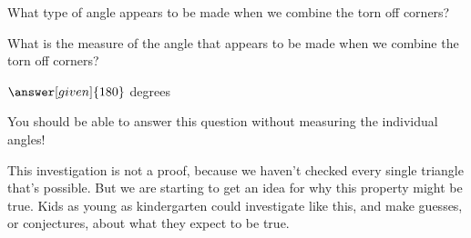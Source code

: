 \documentclass{ximera}
\begin{document}
\begin{question}
What type of angle appears to be made when we combine the torn off corners?
\begin{multipleChoice}
\end{multipleChoice}
\end{question}

\begin{question} 
  What is the measure of the angle that appears to be made when we combine the torn off corners?
\begin{prompt}
	$\answer[given]{180}$ degrees
  \begin{hint}
    You should be able to answer this question without measuring the individual angles!
  \end{hint}
\end{prompt}
\end{question}

This investigation is not a proof, because we haven't checked every single triangle that's possible. But we are starting to get an idea for why this property might be true. Kids as young as kindergarten could investigate like this, and make guesses, or conjectures, about what they expect to be true.
\end{document}
